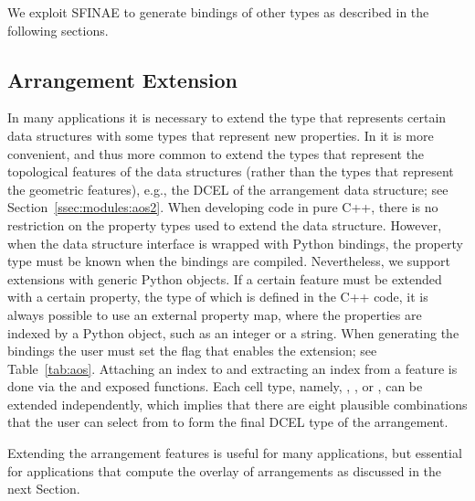 \noindent%
We exploit SFINAE to generate bindings of other types as described in the following sections.

\subsection{Arrangement Extension}
\label{sec:code:ae}
In many applications it is necessary to extend the type that
represents certain \cgal{} data structures with some types that
represent new properties. In \cgal{} it is more convenient, and thus
more common to extend the types that represent the topological
features of the data structures (rather than the types that represent
the geometric features), e.g., the DCEL of the arrangement data
structure; see Section~\ref{ssec:modules:aos2}. When developing code
in pure C++, there is no restriction on the property types used to
extend the data structure. However, when the data structure interface
is wrapped with Python bindings, the property type must be known when
the bindings are compiled. Nevertheless, we support extensions with
generic Python objects. If a certain feature must be extended with a
certain property, the type of which is defined in the C++ code, it is
always possible to use an external property map, where the properties
are indexed by a Python object, such as an integer or a string. When
generating the bindings the user must set the flag that enables the
extension; see Table~\ref{tab:aos}. Attaching an index to and
extracting an index from a feature is done via the
 and  exposed
functions. Each cell type, namely, ,
, or , can be extended
independently, which implies that there are eight plausible
combinations that the user can select from to form the final DCEL type
of the arrangement.

Extending the arrangement features is useful for many applications,
but essential for applications that compute the overlay of
arrangements as discussed in the next Section.


